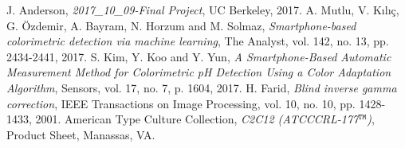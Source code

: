 \documentclass[journal]{IEEEtran}
\begin{document}

%
%
%
\begin{thebibliography}{1}
 J. Anderson, \emph{2017\_10\_09-Final Project}, UC Berkeley, 2017.
 A. Mutlu, V. Kılıç, G. Özdemir, A. Bayram, N. Horzum and M. Solmaz, \emph{Smartphone-based colorimetric detection via machine learning}, The Analyst, vol. 142, no. 13, pp. 2434-2441, 2017.
 S. Kim, Y. Koo and Y. Yun, \emph{A Smartphone-Based Automatic Measurement Method for Colorimetric pH Detection Using a Color Adaptation Algorithm}, Sensors, vol. 17, no. 7, p. 1604, 2017.
 H. Farid, \emph{Blind inverse gamma correction}, IEEE Transactions on Image Processing, vol. 10, no. 10, pp. 1428-1433, 2001.
 American Type Culture Collection, \emph{C2C12 (ATCC\textregistered CRL-177$^\texttt{TM}$)}, Product Sheet, Manassas, VA.

\end{thebibliography}
\end{document}
